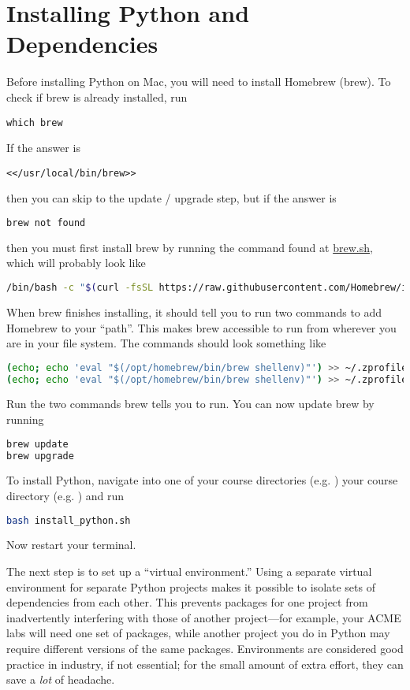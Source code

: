 \section*{Installing Python and Dependencies}
\ifwindows
\else
    Before installing Python on Mac, you will need to install Homebrew (brew).
    To check if brew is already installed, run
\begin{lstlisting}
which brew
\end{lstlisting}
    If the answer is 
\begin{lstlisting}
<</usr/local/bin/brew>>
\end{lstlisting}
    then you can skip to the update / upgrade step, but if the answer is
\begin{lstlisting}[language=bash]
brew not found
\end{lstlisting}
    then you must first install brew by running the command found at \href{brew.sh}{brew.sh}, which will probably look like
\begin{lstlisting}[language=bash]
/bin/bash -c "$(curl -fsSL https://raw.githubusercontent.com/Homebrew/install/HEAD/install.sh)"
\end{lstlisting}
When brew finishes installing, it should tell you to run two commands to add Homebrew to your ``path''.
This makes brew accessible to run from wherever you are in your file system.
The commands should look something like
\begin{lstlisting}[language=bash]
(echo; echo 'eval "$(/opt/homebrew/bin/brew shellenv)"') >> ~/.zprofile
(echo; echo 'eval "$(/opt/homebrew/bin/brew shellenv)"') >> ~/.zprofile
\end{lstlisting}
Run the two commands brew tells you to run.
You can now update brew by running
\begin{lstlisting}[language=bash]
brew update
brew upgrade
\end{lstlisting}
\fi

To install Python, navigate into
\ifbootcamp
one of your course directories (e.g. ) 
\else 
your course directory (e.g. )
\fi
and run 
\begin{lstlisting}[language=bash]
bash install_python.sh
\end{lstlisting}
Now restart your terminal.

The next step is to set up a ``virtual environment.''
Using a separate virtual environment for separate Python projects makes it possible to isolate sets of dependencies from each other.
This prevents packages for one project from inadvertently interfering with those of another project---for example, your ACME labs will need one set of packages, while another project you do in Python may require different versions of the same packages.
Environments are considered good practice in industry, if not essential; for the small amount of extra effort, they can save a \emph{lot} of headache.

